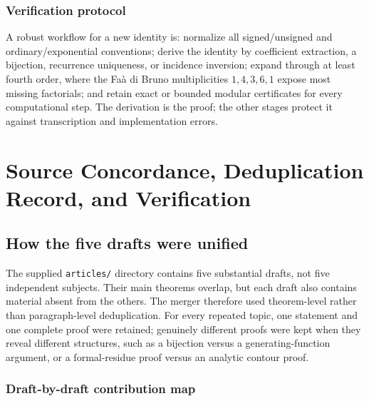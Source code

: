 \documentclass[11pt,a4paper,oneside,openany]{book}
\theoremstyle{definition}
\theoremstyle{remark}
\begin{document}
\section{Verification protocol}

A robust workflow for a new identity is: normalize all signed/unsigned and
ordinary/exponential conventions; derive the identity by coefficient
extraction, a bijection, recurrence uniqueness, or incidence inversion;
expand through at least fourth order, where the Faà di Bruno multiplicities
$1,4,3,6,1$ expose most missing factorials; and retain exact or bounded modular
certificates for every computational step.  The derivation is the proof; the
other stages protect it against transcription and implementation errors.

\part{Source Concordance, Deduplication Record, and Verification}

\chapter{How the five drafts were unified}
\label{ch:merged-concordance}

The supplied \nolinkurl{articles/} directory contains five substantial drafts,
not five independent subjects.  Their main theorems overlap, but each draft also
contains material absent from the others.  The merger therefore used theorem-level
rather than paragraph-level deduplication.  For every repeated topic, one statement
and one complete proof were retained; genuinely different proofs were kept when
they reveal different structures, such as a bijection versus a generating-function
argument, or a formal-residue proof versus an analytic contour proof.

\section{Draft-by-draft contribution map}
\end{document}
